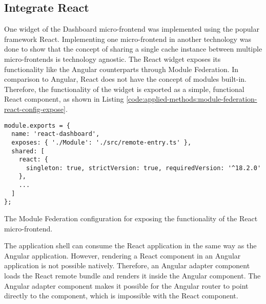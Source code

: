 \subsection{Integrate React}\label{subsection:applied-methods:prototypical-implementation:react-micro-frontend}

One widget of the Dashboard micro-frontend was implemented using the popular framework React. Implementing one micro-frontend in another technology was done to show that the concept of sharing a single cache instance between multiple micro-frontends is technology agnostic. The React widget exposes its functionality like the Angular counterparts through Module Federation. In comparison to Angular, React does not have the concept of modules built-in. Therefore, the functionality of the widget is exported as a simple, functional React component, as shown in Listing  \ref{code:applied-methods:module-federation-react-config-expose}.

\ifshowListings
\begin{listing}[H]
  \begin{verbatim}
module.exports = {
  name: 'react-dashboard',
  exposes: { './Module': './src/remote-entry.ts' },
  shared: [
    react: {
      singleton: true, strictVersion: true, requiredVersion: '^18.2.0' 
    },
    ...
  ]
};
  \end{verbatim}
  \caption{The Module Federation configuration for exposing the functionality of the React micro-frontend.}\label{code:applied-methods:module-federation-react-config-expose}
\end{listing}
\fi

\noindent The application shell can consume the React application in the same way as the Angular application. However, rendering a React component in an Angular application is not possible natively. Therefore, an Angular adapter component loads the React remote bundle and renders it inside the Angular component. The Angular adapter component makes it possible for the Angular router to point directly to the component, which is impossible with the React component.

\bigskip

